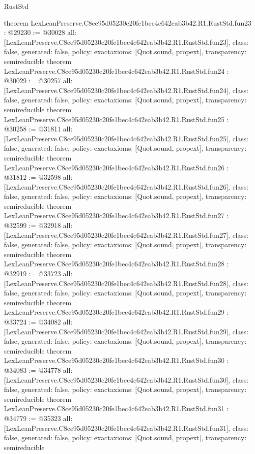 \begin{lexlean}{RustStd}
\begin{coremodule}
{}
theorem LexLeanPreserve.C8ce95d05230c20fe1bec4c642eab3b42.R1.RustStd.fun23 : @29230 := @30028 {
  all: [LexLeanPreserve.C8ce95d05230c20fe1bec4c642eab3b42.R1.RustStd.fun23],
  class: false,
  generated: false,
  policy: exact{axioms: [Quot.sound, propext]},
  transparency: semireducible
}
theorem LexLeanPreserve.C8ce95d05230c20fe1bec4c642eab3b42.R1.RustStd.fun24 : @30029 := @30257 {
  all: [LexLeanPreserve.C8ce95d05230c20fe1bec4c642eab3b42.R1.RustStd.fun24],
  class: false,
  generated: false,
  policy: exact{axioms: [Quot.sound, propext]},
  transparency: semireducible
}
theorem LexLeanPreserve.C8ce95d05230c20fe1bec4c642eab3b42.R1.RustStd.fun25 : @30258 := @31811 {
  all: [LexLeanPreserve.C8ce95d05230c20fe1bec4c642eab3b42.R1.RustStd.fun25],
  class: false,
  generated: false,
  policy: exact{axioms: [Quot.sound, propext]},
  transparency: semireducible
}
theorem LexLeanPreserve.C8ce95d05230c20fe1bec4c642eab3b42.R1.RustStd.fun26 : @31812 := @32598 {
  all: [LexLeanPreserve.C8ce95d05230c20fe1bec4c642eab3b42.R1.RustStd.fun26],
  class: false,
  generated: false,
  policy: exact{axioms: [Quot.sound, propext]},
  transparency: semireducible
}
theorem LexLeanPreserve.C8ce95d05230c20fe1bec4c642eab3b42.R1.RustStd.fun27 : @32599 := @32918 {
  all: [LexLeanPreserve.C8ce95d05230c20fe1bec4c642eab3b42.R1.RustStd.fun27],
  class: false,
  generated: false,
  policy: exact{axioms: [Quot.sound, propext]},
  transparency: semireducible
}
theorem LexLeanPreserve.C8ce95d05230c20fe1bec4c642eab3b42.R1.RustStd.fun28 : @32919 := @33723 {
  all: [LexLeanPreserve.C8ce95d05230c20fe1bec4c642eab3b42.R1.RustStd.fun28],
  class: false,
  generated: false,
  policy: exact{axioms: [Quot.sound, propext]},
  transparency: semireducible
}
theorem LexLeanPreserve.C8ce95d05230c20fe1bec4c642eab3b42.R1.RustStd.fun29 : @33724 := @34082 {
  all: [LexLeanPreserve.C8ce95d05230c20fe1bec4c642eab3b42.R1.RustStd.fun29],
  class: false,
  generated: false,
  policy: exact{axioms: [Quot.sound, propext]},
  transparency: semireducible
}
theorem LexLeanPreserve.C8ce95d05230c20fe1bec4c642eab3b42.R1.RustStd.fun30 : @34083 := @34778 {
  all: [LexLeanPreserve.C8ce95d05230c20fe1bec4c642eab3b42.R1.RustStd.fun30],
  class: false,
  generated: false,
  policy: exact{axioms: [Quot.sound, propext]},
  transparency: semireducible
}
theorem LexLeanPreserve.C8ce95d05230c20fe1bec4c642eab3b42.R1.RustStd.fun31 : @34779 := @35323 {
  all: [LexLeanPreserve.C8ce95d05230c20fe1bec4c642eab3b42.R1.RustStd.fun31],
  class: false,
  generated: false,
  policy: exact{axioms: [Quot.sound, propext]},
  transparency: semireducible
}
\end{coremodule}
\end{lexlean}
